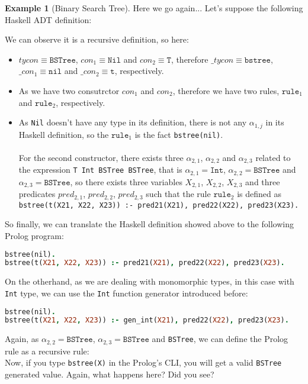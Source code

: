 \documentclass{report}
\theoremstyle{definition}
\newtheorem{example}{Example}[section]
\theoremstyle{definition}
\newcommand{\ttt}[1]{\texttt{#1}}
\begin{document}
\begin{example}[Binary Search Tree]
	Here we go again... Let's suppose the following Haskell ADT definition:
	
	We can observe it is a recursive definition, so here:
	\begin{itemize}
		\item $tycon \equiv \ttt{BSTree}$, $con_1 \equiv \ttt{Nil}$ and $con_2 \equiv \ttt{T}$, therefore $\_tycon \equiv \ttt{bstree}$, $\_con_1 \equiv \ttt{nil}$ and $\_con_2 \equiv \ttt{t}$, respectively.
		\item As we have two consutrctor $con_1$ and $con_2$, therefore we have two rules, $\ttt{rule}_1$ and $\ttt{rule}_2$, respectively.
		\item As \ttt{Nil} doesn't have any type in its definition, there is not any $\alpha_{1,j}$ in its Haskell definition, so the $\ttt{rule}_1$ is the fact \ttt{bstree(nil)}.\\\\
		For the second constructor, there exists three $\alpha_{2,1}$, $\alpha_{2,2}$ and $\alpha_{2,3}$ related to the expression \ttt{T Int BSTree BSTree}, that is $\alpha_{2,1} = \ttt{Int}$, $\alpha_{2,2} = \ttt{BSTree}$ and $\alpha_{2,3} = \ttt{BSTree}$, so there exists three variables $X_{2,1}$, $X_{2,2}$, $X_{2,3}$ and three predicates $pred_{2,1}$, $pred_{2,2}$, $pred_{2,3}$ such that the rule $\ttt{rule}_2$ is defined as \\ \ttt{bstree(t(X21, X22, X23)) :- pred21(X21), pred22(X22), pred23(X23).}
	\end{itemize}
	So finally, we can translate the Haskell definition showed above to the following Prolog program:\\
\begin{lstlisting}[language=Prolog]
bstree(nil).																														%% rule 1
bstree(t(X21, X22, X23)) :- pred21(X21), pred22(X22), pred23(X23).			%% rule 2
\end{lstlisting}
On the otherhand, as we are dealing with monomorphic types, in this case with \ttt{Int} type, we can use the \ttt{Int} function generator introduced before:\\
\begin{lstlisting}[language=Prolog]
bstree(nil).																														%% rule 1
bstree(t(X21, X22, X23)) :- gen_int(X21), pred22(X22), pred23(X23).			%% rule 2
\end{lstlisting}
Again, as $\alpha_{2,2} = \ttt{BSTree}$, $\alpha_{2,3} = \ttt{BSTree}$ and \ttt{BSTree}, we can define the Prolog rule as a recursive rule:\\

Now, if you type \ttt{bstree(X)} in the Prolog's CLI, you will get a valid \ttt{BSTree} generated value. Again, what happens here? Did you see?\\
\end{example}
\end{document}
